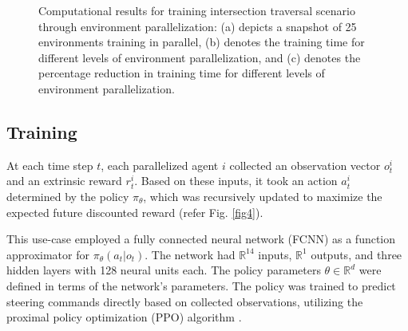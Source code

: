 \documentclass[letterpaper, 10 pt, conference]{ieeeconf}  %
\begin{document}
\begin{figure}[t]
\begin{subfigure}[b]{0.32\linewidth}
         \caption{}
         \label{fig7c}
     \end{subfigure}
     \caption{Computational results for training intersection traversal scenario through environment parallelization: (a) depicts a snapshot of 25 environments training in parallel, (b) denotes the training time for different levels of environment parallelization, and (c) denotes the percentage reduction in training time for different levels of environment parallelization.}
    \label{fig7}
\end{figure}

\subsection{Training}
\label{Sub-Section: Training I}

At each time step $t$, each parallelized agent $i$ collected an observation vector $o_t^i$ and an extrinsic reward $r_t^i$. Based on these inputs, it took an action $a_t^i$ determined by the policy $\pi_\theta$, which was recursively updated to maximize the expected future discounted reward (refer Fig. \ref{fig4}).

This use-case employed a fully connected neural network (FCNN) as a function approximator for $\pi_\theta \left ( a_t | o_t \right )$. The network had $\mathbb{R}^{14}$ inputs, $\mathbb{R}^{1}$ outputs, and three hidden layers with 128 neural units each. The policy parameters $\theta \in \mathbb{R}^d$ were defined in terms of the network's parameters. The policy was trained to predict steering commands directly based on collected observations, utilizing the proximal policy optimization (PPO) algorithm \cite{PPO2017}.
\end{document}

